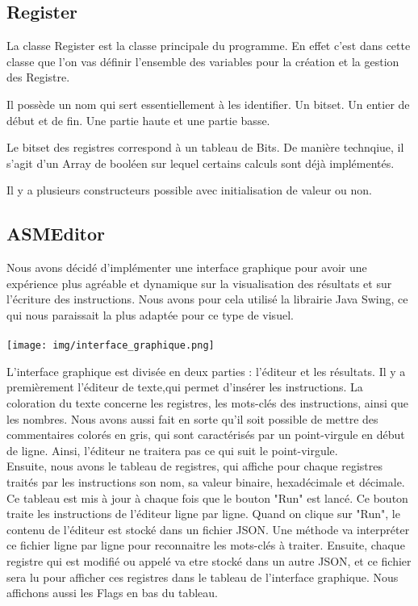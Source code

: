 \documentclass{article}
\begin{document}
\subsection{Register}
La classe Register est la classe principale du programme. En effet c'est dans cette classe que l'on vas définir l'ensemble des variables pour la création et la gestion des Registre.

Il possède un nom qui sert essentiellement à les identifier.
Un bitset.
Un entier de début et de fin.
Une partie haute et une partie basse.

Le bitset des registres correspond à un tableau de Bits. De manière technqiue, il s'agit d'un Array de booléen sur lequel certains calculs sont déjà implémentés.

Il y a plusieurs constructeurs possible avec initialisation de valeur ou non.

\subsection{ASMEditor}

Nous avons décidé d'implémenter une interface graphique pour avoir une expérience plus agréable et dynamique sur la visualisation des résultats et sur
l'écriture des instructions.
Nous avons pour cela utilisé la librairie Java Swing, ce qui nous paraissait la plus adaptée pour ce type de visuel.
\\
\\
\texttt{[image: img/interface\_graphique.png]}

L'interface graphique est divisée en deux parties : l'éditeur et les résultats.
Il y a premièrement l'éditeur de texte,qui permet d'insérer les instructions.
La coloration du texte concerne les registres, les mots-clés des instructions, ainsi que les nombres.
Nous avons aussi fait en sorte qu'il soit possible de mettre des commentaires colorés en gris, qui sont caractérisés par un point-virgule en début de ligne.
Ainsi, l'éditeur ne traitera pas ce qui suit le point-virgule.
\\
Ensuite, nous avons le tableau de registres, qui affiche pour chaque registres traités par les instructions son nom, sa valeur binaire, hexadécimale et décimale.
Ce tableau est mis à jour à chaque fois que le bouton "Run" est lancé.
Ce bouton traite les instructions de l'éditeur ligne par ligne.
Quand on clique sur "Run", le contenu de l'éditeur est stocké dans un fichier JSON.
Une méthode va interpréter ce fichier ligne par ligne pour reconnaitre les mots-clés à traiter.
Ensuite, chaque registre qui est modifié ou appelé va etre stocké dans un autre JSON, et ce fichier sera lu pour afficher ces registres dans le tableau de l'interface graphique.
Nous affichons aussi les Flags en bas du tableau.
\end{document}
